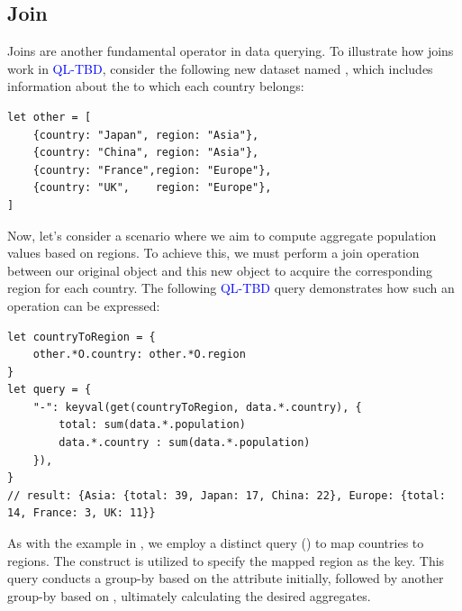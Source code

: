 \documentclass[runningheads]{llncs}
\newcommand{\lang}{\textcolor{blue}{QL-TBD}}
\begin{document}
\subsection{Join}
Joins are another fundamental operator in data querying.
To illustrate how joins work in \lang{}, consider the following
new dataset named , which includes information about the
 to which each country belongs:

\begin{lstlisting}[style=JavaScript, columns=flexible]
let other = [
    {country: "Japan", region: "Asia"},
    {country: "China", region: "Asia"},
    {country: "France",region: "Europe"},
    {country: "UK",    region: "Europe"},
]
\end{lstlisting}

Now, let's consider a scenario where we aim to compute aggregate population
values based on regions.
To achieve this, we must perform a join operation between our original
 object and this new  object to acquire the
corresponding region for each country.
The following \lang{} query demonstrates how such an operation can be
expressed:

\begin{lstlisting}[style=JavaScript, columns=flexible]
let countryToRegion = {
    other.*O.country: other.*O.region
}
let query = {
    "-": keyval(get(countryToRegion, data.*.country), {
        total: sum(data.*.population)
        data.*.country : sum(data.*.population)
    }),
}
// result: {Asia: {total: 39, Japan: 17, China: 22}, Europe: {total: 14, France: 3, UK: 11}}
\end{lstlisting}

As with the example in , we employ a distinct query
() to map countries to regions.
The  construct is utilized to specify the mapped region
as the key.
This query conducts a group-by based on the  attribute initially,
followed by another group-by based on , ultimately calculating the
desired aggregates.

\end{document}
